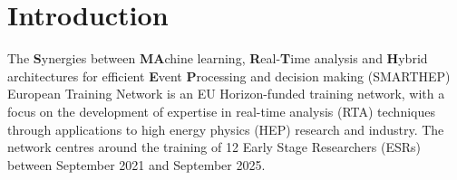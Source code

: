 \section{Introduction}
\label{intro}
The \textbf{S}ynergies between \textbf{MA}chine learning, \textbf{R}eal-\textbf{T}ime analysis and \textbf{H}ybrid architectures for efficient \textbf{E}vent \textbf{P}rocessing and decision making (SMARTHEP) European Training Network is an EU Horizon-funded training network, with a focus on the development of expertise in real-time analysis (RTA) techniques through applications to high energy physics (HEP) research and industry. The network centres around the training of 12 Early Stage Researchers (ESRs) between September 2021 and September 2025.
